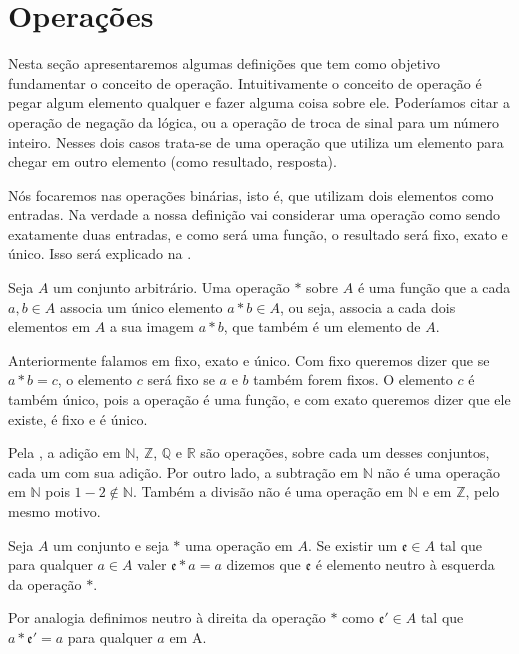 \documentclass[../main.tex]{subfiles}
\begin{document}
\section{Operações}

Nesta seção apresentaremos algumas definições que tem como objetivo fundamentar o conceito de operação. Intuitivamente o conceito de operação é pegar algum elemento qualquer e fazer alguma coisa sobre ele. Poderíamos citar a operação de negação da lógica, ou a operação de troca de sinal para um número inteiro. Nesses dois casos trata-se de uma operação que utiliza um elemento para chegar em outro elemento (como resultado, resposta).

Nós focaremos nas operações binárias, isto é, que utilizam dois elementos como entradas. Na verdade a nossa definição vai considerar uma operação como sendo exatamente duas entradas, e como será uma função, o resultado será fixo, exato e único. Isso será explicado na .

\begin{defi}\label{agb-def-operacao}
    Seja $A$ um conjunto arbitrário. Uma operação $*$ sobre $A$ é uma função que a cada $a,b \in A$ associa um único elemento $a * b \in A$, ou seja, associa a cada dois elementos em $A$ a sua imagem $a * b$, que também é um elemento de $A$. 
\end{defi}

\begin{obs}\label{agb-obs-operacao}
    Anteriormente falamos em fixo, exato e único. Com fixo queremos dizer que se $a*b = c$, o elemento $c$ será fixo se $a$ e $b$ também forem fixos. O elemento $c$ é também único, pois a operação é uma função, e com exato queremos dizer que ele existe, é fixo e é único. 
\end{obs}

Pela , a adição em $\mathbb{N}$, $\mathbb{Z}$, $\mathbb{Q}$ e $\mathbb{R}$ são operações, sobre cada um desses conjuntos, cada um com sua adição. Por outro lado, a subtração em $\mathbb{N}$ não é uma operação em $\mathbb{N}$ pois $1-2 \not \in \mathbb{N}$. Também a divisão não é uma operação em $\mathbb{N}$ e em $\mathbb{Z}$, pelo mesmo motivo.

\begin{defi}
    Seja $A$ um conjunto e seja $*$ uma operação em $A$. Se existir um $\mathfrak{e} \in A$ tal que para qualquer $a \in A$ valer $\mathfrak{e} * a = a$ dizemos que $\mathfrak{e}$ é elemento neutro à esquerda da operação $*$. 
\end{defi}
Por analogia definimos neutro à direita da operação $*$ como $\mathfrak{e'} \in A$ tal que $a * \mathfrak{e'} = a$ para qualquer $a$ em A.
\end{document}
